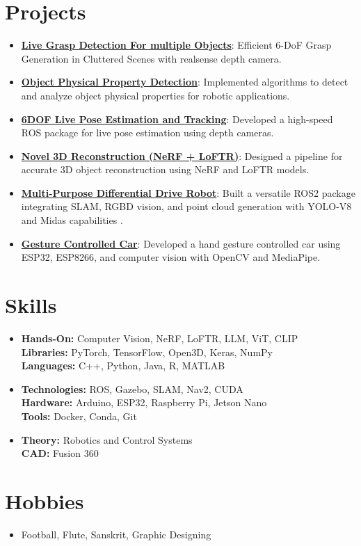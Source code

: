 \documentclass[letterpaper,11pt]{article}
\newcommand{\resumeItem}[2]{
  \item\small{
    \textbf{#1}{: #2 \vspace{-2pt}}
  }
}
\newcommand{\resumeSubItem}[2]{\resumeItem{#1}{#2}\vspace{-4pt}}
\newcommand{\resumeSubHeadingListStart}{\begin{itemize}[leftmargin=*]}
\newcommand{\resumeSubHeadingListEnd}{\end{itemize}}
\begin{document}
\section{Projects}
\resumeSubHeadingListStart
  \resumeSubItem{\href{https://github.com/Kaivalya192/contact_graspnet}{Live Grasp Detection For multiple Objects}}
    {Efficient 6-DoF Grasp Generation in Cluttered Scenes with realsense depth camera.}
  \resumeSubItem{\href{https://github.com/Kaivalya192/Object-Property-Detection}{Object Physical Property Detection}}
    {Implemented algorithms to detect and analyze object physical properties for robotic applications.}
  \resumeSubItem{\href{https://github.com/Kaivalya192/live-pose-ros}{6DOF Live Pose Estimation and Tracking}}
    {Developed a high-speed ROS package for live pose estimation using depth cameras.}
  \resumeSubItem{\href{https://github.com/Kaivalya192/Object_Reconstruction}{Novel 3D Reconstruction (NeRF + LoFTR)}}
    {Designed a pipeline for accurate 3D object reconstruction using NeRF and LoFTR models.}
  \resumeSubItem{\href{https://github.com/Kaivalya192/bot_spawn}{Multi-Purpose Differential Drive Robot}}
    {Built a versatile ROS2 package integrating SLAM, RGBD vision, and point cloud generation with YOLO-V8 and Midas capabilities .}
  \resumeSubItem{\href{https://github.com/Kaivalya192/gesture_car}{Gesture Controlled Car}}
    {Developed a hand gesture controlled car using ESP32, ESP8266, and computer vision with OpenCV and MediaPipe.}
\resumeSubHeadingListEnd

\section{Skills}
\resumeSubHeadingListStart
  \item{
    \textbf{Hands-On:} Computer Vision, NeRF, LoFTR, LLM, ViT, CLIP \\
    \textbf{Libraries:} PyTorch, TensorFlow, Open3D, Keras, NumPy \\
    \textbf{Languages:} C++, Python, Java, R, MATLAB
  }
  \item{
    \textbf{Technologies:} ROS, Gazebo, SLAM, Nav2, CUDA \\
    \textbf{Hardware:} Arduino, ESP32, Raspberry Pi, Jetson Nano \\
    \textbf{Tools:} Docker, Conda, Git
  }
  \item{
    \textbf{Theory:} Robotics and Control Systems \\
    \textbf{CAD:} Fusion 360
  }
\resumeSubHeadingListEnd

\section{Hobbies}
\resumeSubHeadingListStart
  \item{Football, Flute, Sanskrit, Graphic Designing}
\resumeSubHeadingListEnd

\end{document}
